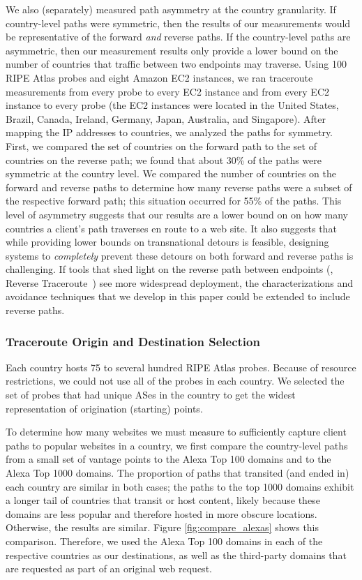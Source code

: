 We also (separately)
measured path asymmetry at the country granularity. If country-level paths
were symmetric, then the results of our measurements would be representative
of the forward {\it and} reverse paths. If the country-level paths are
asymmetric, then our measurement results only provide a lower bound on the
number of countries that traffic between two endpoints may traverse.  Using
100 RIPE Atlas probes and eight Amazon EC2 instances,
we ran traceroute measurements from every probe to every EC2 instance and from
every EC2 instance to every probe (the EC2 instances were located in the United States, Brazil, 
Canada, Ireland, Germany, Japan, Australia, and Singapore).  After mapping the IP addresses to countries, we
analyzed the paths for symmetry.  First, we compared the set of countries on
the forward path to the set of countries on the reverse path; we found that about 30\% of the 
paths were symmetric at the country level.  We compared the number of countries on the forward and
reverse paths to determine how many reverse paths were a subset of the
respective forward path; this situation occurred for 55\% of the paths. This
level of asymmetry suggests that our results are a lower bound on on how many countries a client’s 
path traverses en route to a web site. It also suggests that
while providing lower bounds on transnational detours is feasible, designing
systems to {\em completely} prevent these detours on both forward and reverse
paths is challenging. If tools that shed light on the reverse path
between endpoints (\eg, Reverse Traceroute~\cite{katz2010reverse}) see more widespread deployment,
the characterizations and avoidance techniques that we develop in this paper could
be extended to include reverse paths.

\subsubsection{Traceroute Origin and Destination Selection}

Each country hosts 75 to several hundred RIPE Atlas probes.  Because of resource
restrictions, we could not use all of the probes in each country.  We
selected the set of probes that had unique ASes in the country to get
the widest representation of origination (starting) points.

To determine how many websites we must measure to sufficiently capture client 
paths to popular websites in a country, we first compare the country-level paths from a small set of vantage 
points to the Alexa Top 100 domains 
 and to the Alexa Top 1000 domains.  The proportion of paths that transited (and
ended in) each country are similar in both cases; the paths to the top 1000
domains exhibit a longer tail of countries that transit or host content,
likely because these domains are less popular and therefore hosted in more
obscure locations. Otherwise, the results are similar. Figure \ref{fig:compare_alexas} 
shows this comparison.  Therefore, we used the Alexa Top 100 
domains in each of the respective countries as our destinations, as well as the third-party 
domains that are requested as part of an original web request. 

